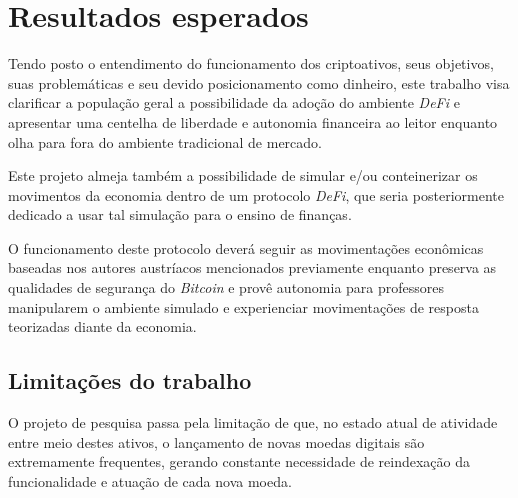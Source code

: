 \chapter{Resultados esperados}

Tendo posto o entendimento do funcionamento dos criptoativos, seus objetivos, suas problemáticas e seu devido posicionamento como dinheiro, este trabalho visa clarificar a população geral a possibilidade da adoção do ambiente \textit{DeFi} e apresentar uma centelha de liberdade e autonomia financeira ao leitor enquanto olha para fora do ambiente tradicional de mercado.

Este projeto almeja também a possibilidade de simular e/ou conteinerizar os movimentos da economia dentro de um protocolo \textit{DeFi}, que seria posteriormente dedicado a usar tal simulação para o ensino de finanças.

O funcionamento deste protocolo deverá seguir as movimentações econômicas baseadas nos autores austríacos mencionados previamente enquanto preserva as qualidades de segurança do \textit{Bitcoin} e provê autonomia para professores manipularem o ambiente simulado e experienciar movimentações de resposta teorizadas diante da economia.

\section{Limitações do trabalho}

O projeto de pesquisa passa pela limitação de que, no estado atual de atividade entre meio destes ativos, o lançamento de novas moedas digitais são extremamente frequentes, gerando constante necessidade de reindexação da funcionalidade e atuação de cada nova moeda.

